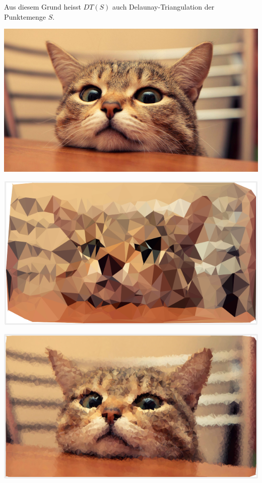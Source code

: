 Aus diesem Grund heisst $DT(S)$ auch Delaunay-Triangulation der Punktemenge $S$.

\begin{minipage}[t]{0.3\textwidth}
    \includegraphics[width=\textwidth]{images/delaunay_example_01_orig.png}
\label{fig:delaunayExample01Orig}
\end{minipage}
\begin{minipage}[t]{0.3\textwidth}
    \includegraphics[width=\textwidth]{images/delaunay_example_01_500.png}
\label{fig:delaunayExample01500}
\end{minipage}
\begin{minipage}[t]{0.3\textwidth}
    \includegraphics[width=\textwidth]{images/delaunay_example_01_8000.png}
\label{fig:delaunayExample018000}
\end{minipage}
